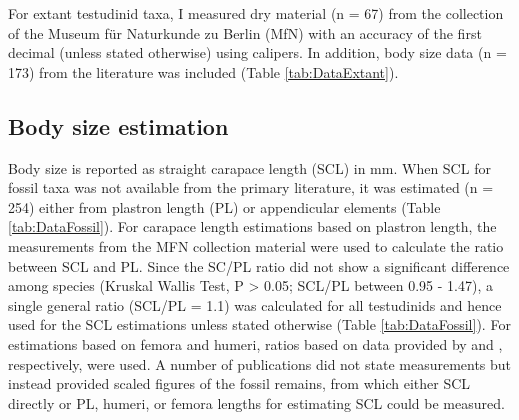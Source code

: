 For extant testudinid taxa, I measured dry material (n = 67) from the collection of the Museum für Naturkunde zu Berlin (MfN) with an accuracy of the first decimal (unless stated otherwise) using calipers. In addition, body size data (n = 173) from the literature was included (Table \ref{tab:DataExtant}).

\subsection{Body size estimation}
Body size is reported as straight carapace length (SCL) in mm. When SCL for fossil taxa was not available from the primary literature, it was estimated (n = 254) either from plastron length (PL) or appendicular elements (Table \ref{tab:DataFossil}). For carapace length estimations based on plastron length, the measurements from the MFN collection material were used to calculate the ratio between SCL and PL. Since the SC/PL ratio did not show a significant difference among species (Kruskal Wallis Test, P > 0.05; SCL/PL between 0.95 - 1.47), a single general ratio (SCL/PL = 1.1) was calculated for all testudinids and hence used for the SCL estimations unless stated otherwise (Table \ref{tab:DataFossil}). For estimations based on femora and humeri, ratios based on data provided by \cite{Hutterer1998} and \cite{Franz2001a}, respectively, were used. A number of publications did not state measurements but instead provided scaled figures of the fossil remains, from which either SCL directly or PL, humeri, or femora lengths for estimating SCL could be measured.




